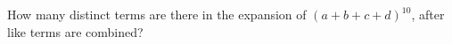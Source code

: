 How many distinct terms are there in the expansion of $(a+b+c+d)^{10}$, after like terms are combined?
